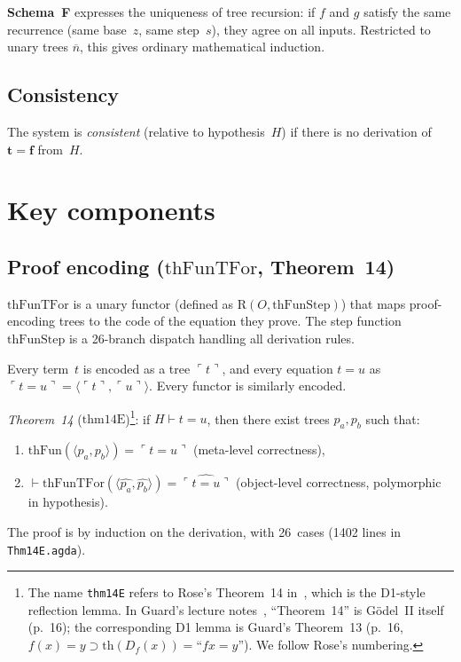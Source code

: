 \documentclass[11pt]{article}
\newcommand{\pair}[2]{\langle #1, #2 \rangle}
\newcommand{\trueT}{\mathbf{t}}
\newcommand{\falseT}{\mathbf{f}}
\newcommand{\SchemaF}{\textbf{Schema~F}}
\newcommand{\nat}[1]{\overline{#1}}
\newcommand{\code}[1]{\ulcorner #1 \urcorner}
\newcommand{\reify}[1]{\widehat{#1}}
\newcommand{\thFun}{\mathrm{thFun}}
\newcommand{\thFunTFor}{\mathrm{thFunTFor}}
\begin{document}
\medskip
\SchemaF{} expresses the uniqueness of tree recursion:
if $f$ and $g$ satisfy the same recurrence (same base~$z$, same step~$s$),
they agree on all inputs.  Restricted to unary trees $\nat{n}$,
this gives ordinary mathematical induction.

\subsection*{Consistency}

The system is \emph{consistent} (relative to hypothesis~$H$)
if there is no derivation of $\trueT = \falseT$ from~$H$.

\section{Key components}

\subsection{Proof encoding ($\thFunTFor$, Theorem~14)}

$\thFunTFor$ is a unary functor
(defined as $\mathrm{R}(O, \mathrm{thFunStep})$)
that maps proof-encoding trees to the code of the equation they prove.
The step function $\mathrm{thFunStep}$ is a 26-branch dispatch
handling all derivation rules.

Every term~$t$ is encoded as a tree $\code{t}$, and every
equation $t = u$ as $\code{t = u} = \pair{\code{t}}{\code{u}}$.
Every functor is similarly encoded.

\emph{Theorem~14} ($\mathrm{thm14E}$)\footnote{The name
\texttt{thm14E} refers to Rose's Theorem~14 in~\cite{rose1961},
which is the D1-style reflection lemma.  In Guard's lecture
notes~\cite{guard1963}, ``Theorem~14'' is G\"odel~II itself
(p.~16); the corresponding D1 lemma is Guard's Theorem~13
(p.~16, $f(x) = y \supset \mathrm{th}(D_f(x)) = \text{``}fx{=}y\text{''}$).
We follow Rose's numbering.}: if $H \vdash t = u$,
then there exist trees $p_a, p_b$ such that:
\begin{enumerate}
\item $\thFun(\pair{p_a}{p_b}) = \code{t = u}$ \quad (meta-level correctness),
\item $\vdash \thFunTFor(\pair{\reify{p_a}}{\reify{p_b}}) = \reify{\code{t = u}}$
  \quad (object-level correctness, polymorphic in hypothesis).
\end{enumerate}
The proof is by induction on the derivation, with 26~cases
(1402 lines in \texttt{Thm14E.agda}).
\end{document}
